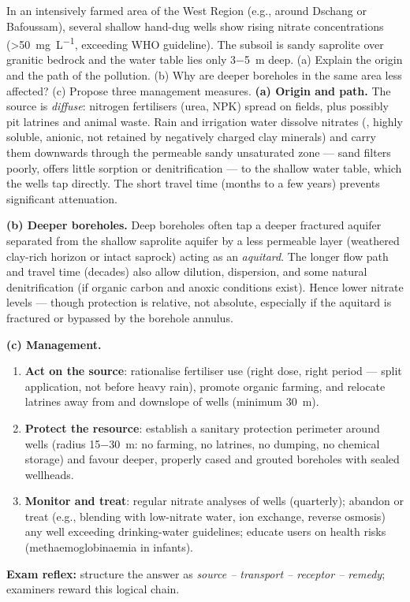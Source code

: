 \documentclass[11pt]{article}
\begin{document}
\begin{exoresolu}
In an intensively farmed area of the West Region (e.g., around Dschang or Bafoussam), several shallow hand-dug wells show rising nitrate concentrations (\SI{>50}{mg.L^{-1}}, exceeding WHO guideline). The subsoil is sandy saprolite over granitic bedrock and the water table lies only \SI{3-5}{m} deep. (a) Explain the origin and the path of the pollution. (b) Why are deeper boreholes in the same area less affected? (c) Propose three management measures.
\tcblower
\textbf{(a) Origin and path.} The source is \emph{diffuse}: nitrogen fertilisers (urea, NPK) spread on fields, plus possibly pit latrines and animal waste. Rain and irrigation water dissolve nitrates (, highly soluble, anionic, not retained by negatively charged clay minerals) and carry them downwards through the permeable sandy unsaturated zone — sand filters poorly, offers little sorption or denitrification — to the shallow water table, which the wells tap directly. The short travel time (months to a few years) prevents significant attenuation.

\textbf{(b) Deeper boreholes.} Deep boreholes often tap a deeper fractured aquifer separated from the shallow saprolite aquifer by a less permeable layer (weathered clay-rich horizon or intact saprock) acting as an \emph{aquitard}. The longer flow path and travel time (decades) also allow dilution, dispersion, and some natural denitrification (if organic carbon and anoxic conditions exist). Hence lower nitrate levels — though protection is relative, not absolute, especially if the aquitard is fractured or bypassed by the borehole annulus.

\textbf{(c) Management.}
\begin{enumerate}
\item \textbf{Act on the source}: rationalise fertiliser use (right dose, right period — split application, not before heavy rain), promote organic farming, and relocate latrines away from and downslope of wells (minimum \SI{30}{m}).
\item \textbf{Protect the resource}: establish a sanitary protection perimeter around wells (radius \SI{15-30}{m}: no farming, no latrines, no dumping, no chemical storage) and favour deeper, properly cased and grouted boreholes with sealed wellheads.
\item \textbf{Monitor and treat}: regular nitrate analyses of wells (quarterly); abandon or treat (e.g., blending with low-nitrate water, ion exchange, reverse osmosis) any well exceeding drinking-water guidelines; educate users on health risks (methaemoglobinaemia in infants).
\end{enumerate}
\textbf{Exam reflex:} structure the answer as \emph{source -- transport -- receptor -- remedy}; examiners reward this logical chain.
\end{exoresolu}
\end{document}

